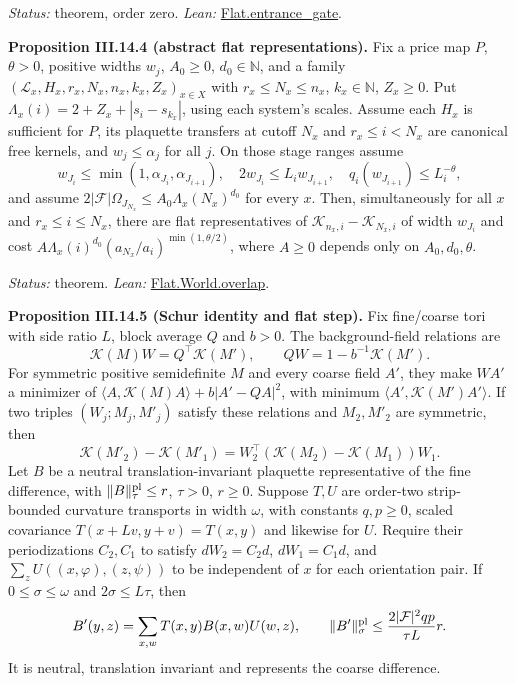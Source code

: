 \documentclass[
  letterpaper,
  11pt]{article}
\begin{document}
\emph{Status:} theorem, order zero. \emph{Lean:}
\href{https://github.com/yang-mills-group/OpenAI-YM-20261028/blob/3456e5e75cf8d4cd558955a5c7638fba2d68f464/YM/RG08/Flat/Entrance.lean\#L28-L50}{Flat.entrance\_gate}.

\textbf{Proposition III.14.4 (abstract flat representations).} Fix a
price map \(P\), \(\theta>0\), positive widths \(w_j\), \(A_0\ge0\),
\(d_0\in\mathbb N\), and a family
\((\mathcal L_x,H_x,r_x,N_x,n_x,k_x,Z_x)_{x\in X}\) with
\(r_x\le N_x\le n_x\), \(k_x\in\mathbb N\), \(Z_x\ge0\). Put
\(\Lambda_x(i)=2+Z_x+|s_i-s_{k_x}|\), using each system's scales. Assume
each \(H_x\) is sufficient for \(P\), its plaquette transfers at cutoff
\(N_x\) and \(r_x\le i<N_x\) are canonical free kernels, and
\(w_j\le\alpha_j\) for all \(j\). On those stage ranges assume
\[w_{J_i}\le\min(1,\alpha_{J_i},\alpha_{J_{i+1}}),\quad
2w_{J_i}\le L_iw_{J_{i+1}},\quad
q_i(w_{J_{i+1}})\le L_i^{-\theta},\] and assume
\(2|\mathcal F|\Omega_{J_{N_x}}\le A_0\Lambda_x(N_x)^{d_0}\) for every
\(x\). Then, simultaneously for all \(x\) and \(r_x\le i\le N_x\), there
are flat representatives of \(\mathcal K_{n_x,i}-\mathcal K_{N_x,i}\) of
width \(w_{J_i}\) and cost
\(A\Lambda_x(i)^{d_0}(a_{N_x}/a_i)^{\min(1,\theta/2)}\), where \(A\ge0\)
depends only on \(A_0,d_0,\theta\).

\emph{Status:} theorem. \emph{Lean:}
\href{https://github.com/yang-mills-group/OpenAI-YM-20261028/blob/3456e5e75cf8d4cd558955a5c7638fba2d68f464/YM/RG08/Flat/World.lean\#L165-L174}{Flat.World.overlap}.

\textbf{Proposition III.14.5 (Schur identity and flat step).} Fix
fine/coarse tori with side ratio \(L\), block average \(Q\) and \(b>0\).
The background-field relations are
\[\mathcal K(M)W=Q^\top\mathcal K(M'),\qquad QW=1-b^{-1}\mathcal K(M').\]
For symmetric positive semidefinite \(M\) and every coarse field \(A'\),
they make \(WA'\) a minimizer of
\(\langle A,\mathcal K(M)A\rangle+b|A'-QA|^2\), with minimum
\(\langle A',\mathcal K(M')A'\rangle\). If two triples
\((W_j;M_j,M'_j)\) satisfy these relations and \(M_2,M'_2\) are
symmetric, then
\[\mathcal K(M'_2)-\mathcal K(M'_1)=W_2^\top(\mathcal K(M_2)-\mathcal K(M_1))W_1.\]
Let \(B\) be a neutral translation-invariant plaquette representative of
the fine difference, with \(\lVert B\rVert^{\rm pl}_\tau\le r\),
\(\tau>0\), \(r\ge0\). Suppose \(T,U\) are order-two strip-bounded
curvature transports in width \(\omega\), with constants \(q,p\ge0\),
scaled covariance \(T(x+Lv,y+v)=T(x,y)\) and likewise for \(U\). Require
their periodizations \(C_2,C_1\) to satisfy \(dW_2=C_2d\),
\(dW_1=C_1d\), and \(\sum_zU((x,\varphi),(z,\psi))\) to be independent
of \(x\) for each orientation pair. If \(0\le\sigma\le\omega\) and
\(2\sigma\le L\tau\), then
\[B'(y,z)=\sum_{x,w}T(x,y)B(x,w)U(w,z),\qquad \lVert B'\rVert^{\rm pl}_\sigma\le\frac{2|\mathcal F|^2qp}{\tau L}r.\]
It is neutral, translation invariant and represents the coarse
difference.
\end{document}
